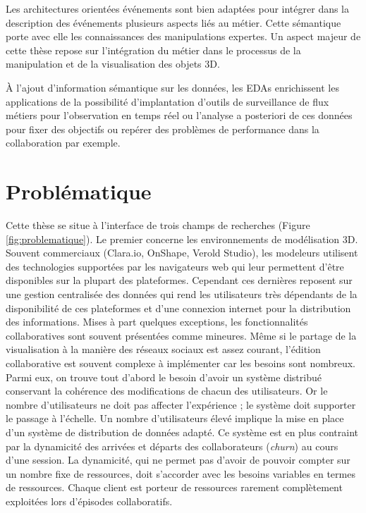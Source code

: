 Les architectures orientées 
événements sont bien adaptées pour intégrer dans la description des 
événements plusieurs aspects liés au métier. 
Cette sémantique porte avec elle les connaissances des manipulations expertes.
Un aspect majeur de cette thèse repose sur l'intégration du métier dans le 
processus de la manipulation et de la visualisation des objets \gls{3D}. 

À l'ajout d'information sémantique sur les données, les \glspl{EDA} enrichissent 
les applications de la possibilité 
d'implantation d'outils de surveillance de flux métiers pour l'observation en temps 
réel ou l'analyse a posteriori de ces données pour fixer des objectifs ou repérer 
des 
problèmes de performance dans la collaboration par exemple.
%
\section{Problématique}


Cette thèse se situe à l'interface de trois champs de recherches (Figure 
\ref{fig:problematique}). Le premier concerne les environnements de modélisation 
3D. Souvent commerciaux (Clara.io, OnShape, Verold Studio), les modeleurs 
utilisent des technologies supportées par les navigateurs web qui leur permettent 
d'être disponibles sur la plupart des plateformes. 
Cependant ces dernières reposent sur une gestion centralisée des données qui rend 
les utilisateurs très dépendants de la disponibilité de ces plateformes et d'une 
connexion internet pour la distribution des informations. 
Mises à part quelques exceptions, les fonctionnalités collaboratives 
sont souvent présentées comme mineures. Même si le \og partage\fg{} de la 
visualisation à la manière des \og réseaux sociaux\fg{} est assez courant, l'édition 
collaborative est souvent complexe à implémenter car les besoins sont nombreux. 
Parmi eux, on trouve tout d'abord le besoin d'avoir un système distribué 
conservant la cohérence des modifications de chacun des utilisateurs. Or 
le nombre d'utilisateurs ne doit pas affecter l'expérience ; le système 
doit supporter le passage à l'échelle. 
Un nombre d'utilisateurs élevé implique la mise en place d'un système de 
distribution de données adapté. Ce système est en plus contraint par la dynamicité
des arrivées et départs des collaborateurs (\textit{churn}) au cours d'une session. 
La dynamicité, qui ne permet pas d'avoir de pouvoir compter sur un nombre fixe de 
ressources, doit s'accorder avec les besoins variables en termes de ressources. 
Chaque client est porteur de ressources rarement complètement exploitées lors 
d'épisodes collaboratifs.

